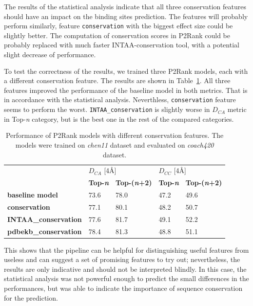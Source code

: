 The results of the statistical analysis indicate that all three conservation features should have an impact on the binding sites prediction. The features will probably perform similarly, feature \texttt{conservation} with the biggest effect size could be slightly better. The computation of conservation scores in P2Rank could be probably replaced with much faster INTAA-conservation tool, with a potential slight decrease of performance.

To test the correctness of the results, we trained three P2Rank models, each with a different conservation feature. The results are shown in Table~\ref{tab:P2Rankconservation}. All three features improved the performance of the baseline model in both metrics. That is in accordance with the statistical analysis. Neverthless, \texttt{conservation} feature seems to perform the worst. \texttt{INTAA\_conservation} is slightly worse in $D_{CA}$ metric in Top-\textit{n} category, but is the best one in the rest of the compared categories.  


\begin{table}[!h] \centering
\begin{tabular}{lllll}
\hline
\textbf{}                     & \multicolumn{2}{l}{$D_{CA}$ {[}4{\AA}{]}}   & \multicolumn{2}{l}{$D_{CC}$ {[}4{\AA}{]}}   \\
                              & \textbf{Top-\textit{n}} & \textbf{Top-(\textit{n}+2)} & \textbf{Top-\textit{n}} & \textbf{Top-(\textit{n}+2)} \\ \hline
\textbf{baseline model}        & 73.6           & 78.0                 & 47.2           & 49.6               \\
\textbf{conservation}         & 77.1           & 80.1               & 48.2           & 50.7               \\
\textbf{INTAA\_conservation}  & 77.6           & 81.7               & 49.1           & 52.2               \\
\textbf{pdbekb\_conservation} & 78.4           & 81.3               & 48.8           & 51.1               \\ \hline
\end{tabular}
\caption[Performance of P2Rank models with different conservation features]{Performance of P2Rank models with different conservation features. The models were trained on \textit{chen11} dataset and evaluated on \textit{coach420} dataset.}
\label{tab:P2Rankconservation}
\end{table}

This shows that the pipeline can be helpful for distinguishing useful features from useless and can suggest a set of promising features to try out; nevertheless, the results are only indicative and should not be interpreted blindly. In this case, the statistical analysis was not powerful enough to predict the small differences in the performances, but was able to indicate the importance of sequence conservation for the prediction.

